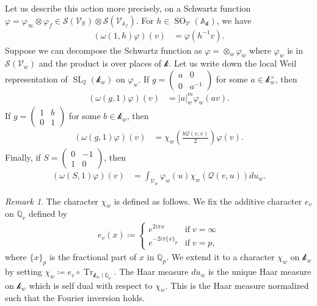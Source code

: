 \documentclass[11pt]{article} %
\newcommand{\8}{\infty}
\newcommand{\kbf}{\mathcal{k}}
\newcommand{\SO}{\operatorname{SO}}
\newcommand{\SL}{\operatorname{SL}}
\newcommand{\R}{\mathbb{R}}
\newcommand{\A}{\mathbb{A}}
\newcommand{\Q}{\mathbb{Q}}
\newcommand{\Tr}{\operatorname{Tr}}
\newcommand{\Scal}{\mathcal{S}}
\newcommand{\Vcal}{\mathcal{V}}
\newcommand{\Qcal}{\mathcal{Q}}
\newcommand{\fin}{f}
\theoremstyle{mytheoremstyle}
\theoremstyle{remark}
\newtheorem{rmk}{Remark}[section]
\numberwithin{equation}{section}
\begin{document}
Let us describe this action more precisely, on a Schwartz function $\varphi=\varphi_\8 \otimes \varphi_\fin \in \Scal(\Vcal_\R) \otimes \Scal(\Vcal_{\A_\fin})$. For $h \in \SO_{\Vcal}(\A_\kbf)$, we have  \begin{align}
    (\omega(1,h)\varphi)(v) & =\varphi(h^{-1}v).
\end{align}
Suppose we can decompose the Schwartz function as $\varphi= \otimes_w \varphi_w$ where $\varphi_{w}$ is in $\Scal(\Vcal_w)$ and the product is over places of $\kbf$. Let us write down the local Weil representation of $\SL_2(\kbf_w)$ on $\varphi_w$. 
If $g=\begin{pmatrix}
        a & 0 \\ 0 & a^{-1}
    \end{pmatrix}$ for some $a \in \kbf_w^\times$, then
\begin{align}
    (\omega(g,1)\varphi)(v) & = \vert a \vert_w^{m} \varphi_w(a v).
\end{align}
If $g=\begin{pmatrix}
        1 & b \\ 0 & 1
    \end{pmatrix}$ for some $b \in \kbf_w$, then
\begin{align}
    (\omega(g,1)\varphi)(v) & = {\chi_w \left (\frac{b\Qcal(v,v)}{2} \right )}\varphi(v).
\end{align}
Finally, if $S=\begin{pmatrix}
        0 & -1 \\ 1 & 0
    \end{pmatrix}$, then
\begin{align}
    (\omega(S,1)\varphi)(v) & =  \int_{\Vcal_{w}} \varphi_w(u)\chi_w(\Qcal(v,u))du_w.
\end{align}
\begin{rmk} The character $\chi_w$ is defined as follows. We fix the additive character $e_v$ on $\Q_v$ defined by
\begin{align}
e_v(x) \coloneqq  \begin{cases} e^{2i\pi x} & \textrm{if} \; v=\8 \\
e^{-2i\pi \{x\}_p} & \textrm{if} \; v=p,
\end{cases}
\end{align}
where $\{x\}_p$ is the fractional part of $x$ in $\Q_p$. We extend it to a character $\chi_w$ on $\kbf_w$ by setting $\chi_w \coloneqq e_v \circ \Tr_{\kbf_w \mid \Q_v}$. The Haar measure $du_w$ is the unique Haar measure on $\kbf_w$ which is self dual with respect to $\chi_{w}$. This is the Haar measure normalized such that the Fourier inversion holds.
\end{rmk}
\end{document}
